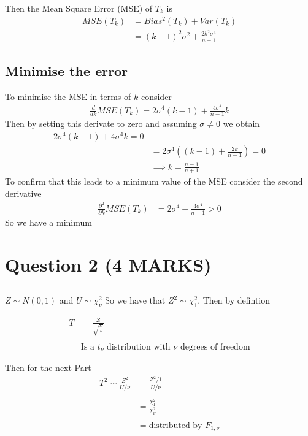 \documentclass[11pt]{article}
\begin{document}
Then the Mean Square Error (MSE) of $T_{k}$ is
\begin{align*}
  MSE(T_{k}) &= Bias^{2}(T_{k}) + Var(T_{k}) \\
             &= (k-1)^{2}\sigma^{2} + \frac{2k^{2}\sigma^{4}}{n-1}
\end{align*}

\subsection{Minimise the error}
To minimise the MSE in terms of $k$ consider
\begin{align*}
  \frac{d}{dk} MSE(T_{k}) = 2\sigma^{4}(k-1) + \frac{4\sigma^{4}}{n-1}k
\end{align*}
Then by setting this derivate to zero and assuming $\sigma \neq 0$ we obtain
\begin{align*}
  2\sigma^{4}(k-1)+4\sigma^{4}k =0 \\
  & = 2\sigma^{4} \left ((k-1)+\frac{2k}{n-1} \right) = 0 \\
  &\implies \boxed{k = \frac{n-1}{n+1}}
\end{align*}
To confirm that this leads to a minimum value of the MSE consider the second derivative
\begin{align*}
  \frac{\partial^{2}}{\partial k} MSE(T_{k}) &= 2\sigma^{4}+\frac{4\sigma^{4}}{n-1}>0
\end{align*}
So we have a minimum
\section{Question 2 (4 MARKS)}
\subsection{ }
$Z \sim N(0,1)$ and $U \sim \chi_{\nu}^{2}$ So we have that $Z^{2} \sim \chi_{1}^{2}$. Then by defintion

\begin{align*}
  T &= \frac{Z}{\sqrt{\frac{U}{\nu}}} \\ \\
  & \boxed{\text{Is a $t_{\nu}$ distribution with $\nu$ degrees of freedom}}
\end{align*}

Then for the next Part
\begin{align*}
  T^{2} \sim  \frac{Z^{2}}{U/\nu} &=\frac{Z^{2}/1}{U/\nu} \\ \\
        &= \frac{\chi_{1}^{2}}{\chi_{\nu}^{2}} \\ \\
        &= \boxed{\text{distributed by } F_{1,\nu}}
\end{align*}
\end{document}
